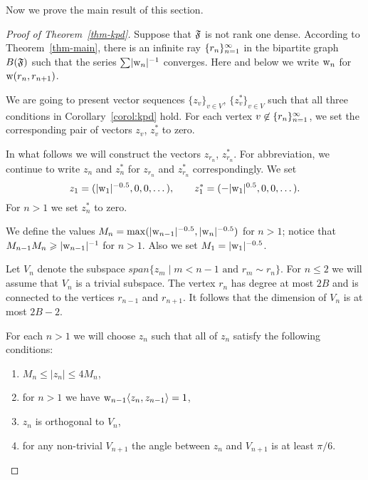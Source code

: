 \documentclass[12pt,oneside,a4paper]{amsart}
\begin{document}
      Now we prove the main result of this section.
      \begin{proof}[Proof of Theorem~\ref{thm-kpd}]
        Suppose that $\mathfrak{F}$ is not rank one dense.
        According to Theorem~\ref{thm-main}, there is an infinite ray $\{{r}_n\}_{n=1}^\infty$ in the bipartite
          graph $B(\mathfrak{F})$ such that the series $\sum\lvert\mathrm{w}_n\rvert^{-1}$ converges.
        Here and below we write $\mathrm{w}_n$ for $\mathrm{w}(r_n, r_{n + 1})$.

        We are going to present vector sequences $\{z_v\}_{v \in V}$, $\{z^*_v\}_{v \in V}$ such that all three conditions in Corollary~\ref{corol:kpd} hold.
        For each vertex $v \not \in \{{r}_n\}_{n=1}^\infty$,
          we set the corresponding pair of vectors $z_v$, $z^*_v$ to zero.

        In what follows we will construct the vectors $z_{r_n}$, $z_{r_n}^*$.
        For abbreviation, we continue to write $z_n$ and $z_n^*$ for $z_{r_n}$ and $z_{r_n}^*$ correspondingly.
        We set
        \[
          z_1=(\lvert\mathrm{w}_1\rvert^{-0.5}, 0, 0, \dots), \qquad z^*_1 = (-\lvert\mathrm{w}_1\rvert^{0.5}, 0, 0, \dots).
        \]
        For $n > 1$ we set $z^*_n$ to zero.

        We define the values $M_n = \max(\lvert\mathrm{w}_{n-1}\rvert^{-0.5}, \lvert\mathrm{w}_n\rvert^{-0.5})$
          for $n > 1$; notice that $M_{n - 1} M_n \geqslant \lvert\mathrm{w}_{n - 1}\rvert^{-1}$ for $n > 1$.
        Also we set $M_1 = \lvert\mathrm{w}_1\rvert^{-0.5}$.

        Let $V_n$ denote the subspace $span\{z_m \mid m < n - 1 \text{ and } r_m \sim r_n\}$.
        For $n \leq 2$ we will assume that $V_n$ is a trivial subspace.
        The vertex $r_n$ has degree at most $2B$ and is connected to the vertices $r_{n-1}$ and $r_{n+1}$.
        It follows that the dimension of $V_n$ is at most $2B - 2$.

        For each $n > 1$ we will choose $z_n$ such that all of $z_n$ satisfy the following conditions:
        \begin{enumerate}[label=\textup{(\alph*)}]
          \item \label{kpd:c1} $M_n \leq \lvert z_n \rvert \leq 4 M_n$,
          \item \label{kpd:c2} for $n > 1$ we have $\mathrm{w}_{n-1}\langle z_n, z_{n - 1} \rangle = 1$,
          \item \label{kpd:c3} $z_n$ is orthogonal to $V_n$,
          \item \label{kpd:c4} for any non-trivial $V_{n + 1}$ the angle between $z_n$ and $V_{n + 1}$
              is at least $\pi/6$.
        \end{enumerate}


\end{proof}
\end{document}
